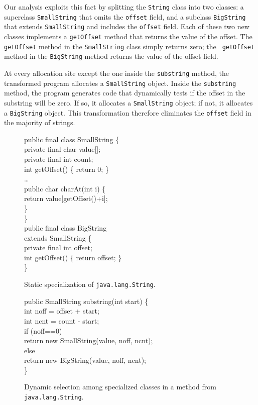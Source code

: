 \documentclass{acmconf}
\begin{document}
Our analysis exploits this fact by splitting the 
{\tt String} class into two classes: a superclass {\tt SmallString}
that omits the {\tt offset} field, and a subclass {\tt BigString} that
extends {\tt SmallString} and includes the {\tt offset} field. 
Each of these two new classes implements a {\tt getOffset} method
that returns the value of the offset. The {\tt getOffset} method
in the {\tt SmallString} class simply returns zero; the {\tt
getOffset} method in the {\tt BigString} method returns the 
value of the offset field. 

At every allocation site except the one inside the {\tt substring}
method, the transformed program allocates a {\tt SmallString} 
object. Inside the {\tt substring} method, the program generates
code that dynamically tests if the offset in the substring
will be zero. If so, it allocates a {\tt SmallString} object;
if not, it allocates a {\tt BigString} object. This transformation
therefore eliminates the {\tt offset} field in the majority
of strings. 

\begin{figure}[tp]
\begin{samplecode}
public final class SmallString \{\\
\>private final char value[];\\
\>private final int count;\\
\>int getOffset() \{ return 0; \}\\
\>\ldots\\
\>public char charAt(int i) \{\\
\>\>return value[getOffset()+i];\\
\>\}\\
\}\\
public final class BigString\\
\>\>extends SmallString \{\\
\>private final int offset;\\
\>int getOffset() \{ return offset; \}\\
\}\\
\end{samplecode}
\caption{Static specialization of {\tt java.lang.String}.}
\label{fig:big-small}
\end{figure}

\begin{figure}[tp]
\begin{samplecode}
public SmallString substring(int start) \{\\
\>int noff = offset + start;\\
\>int ncnt = count - start;\\
\>if (noff==0)\\
\>\>return new SmallString(value, noff, ncnt);\\
\>else\\
\>\>return new BigString(value, noff, ncnt);\\
\}\\
\end{samplecode}
\caption{Dynamic selection among specialized classes in a method
  from {\tt java.lang.String}.}
\label{fig:dyn-select}
\end{figure}
\end{document}

